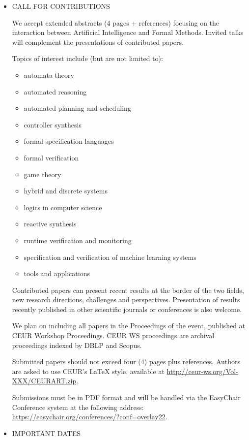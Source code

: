 \documentclass[prodmode,acmtecs]{acmsmall} %
\begin{document}
\begin{itemize}
\item  CALL FOR CONTRIBUTIONS  
 
  We accept extended abstracts (4 pages + references) focusing on the interaction between Artificial Intelligence and Formal Methods. Invited talks will complement the presentations of contributed papers. 
 
  Topics of interest include (but are not limited to): 
 
\begin{itemize}\item  automata theory  
\item  automated reasoning  
\item  automated planning and scheduling  
\item  controller synthesis  
\item  formal specification languages  
\item  formal verification  
\item  game theory  
\item  hybrid and discrete systems  
\item  logics in computer science  
\item  reactive synthesis  
\item  runtime verification and monitoring  
\item  specification and verification of machine learning systems  
\item  tools and applications
\end{itemize} 
  Contributed papers can present recent results at the border of the two fields, new research directions, challenges and perspectives. Presentation of results recently published in other scientific journals or conferences is also welcome. 
 
  We plan on including all papers in the Proceedings of the event, published at CEUR Workshop Proceedings. CEUR WS proceedings are archival proceedings indexed by DBLP and Scopus. 
 
  Submitted papers should not exceed four (4) pages plus references. Authors are asked to use CEUR's LaTeX style, available at \href{http://ceur-ws.org/Vol-XXX/CEURART.zip}{http://ceur-ws.org/Vol-XXX/CEURART.zip}. 
 
  Submissions must be in PDF format and will be handled via the EasyChair Conference system at the following address: \href{https://easychair.org/conferences/?conf=overlay22}{https://easychair.org/conferences/?conf=overlay22}. 
 
\item  IMPORTANT DATES  
 

\end{itemize}
\end{document}
